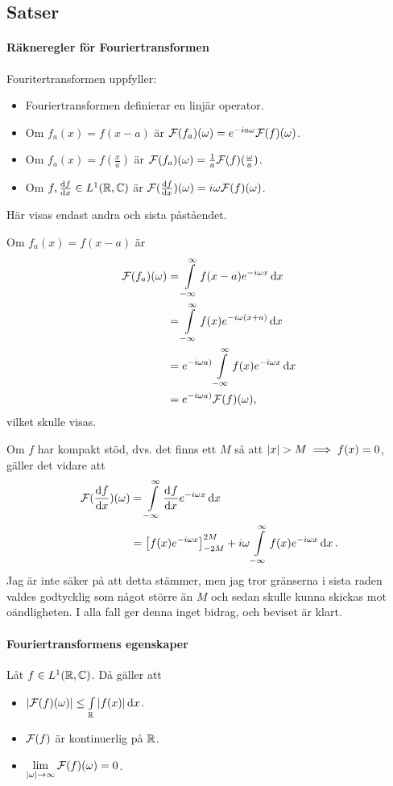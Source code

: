 \subsection{Satser}

\paragraph{Räkneregler för Fouriertransformen}
Fouritertransformen uppfyller:
\begin{itemize}
	\item Fouriertransformen definierar en linjär operator.
	\item Om $f_{a}(x) = f(x - a)$ är $\mathcal{F}(f_{a})(\omega) = e^{-ia\omega}\mathcal{F}(f)(\omega)$.
	\item Om $f_{a}(x) = f(\frac{x}{a})$ är $\mathcal{F}(f_{a})(\omega) = \frac{1}{a}\mathcal{F}(f)(\frac{\omega}{a})$.
	\item Om $f,\dv{f}{x}\in L^{1}(\mathbb{R}, \mathbb{C})$ är $\mathcal{F}(\dv{f}{x})(\omega) = i\omega\mathcal{F}(f)(\omega)$.
\end{itemize}

\proof
Här visas endast andra och sista påståendet.

Om $f_{a}(x) = f(x - a)$ är 
\begin{align*}
	\mathcal{F}(f_{a})(\omega) &= \int\limits_{-\infty}^{\infty}f(x - a)e^{-i\omega x}\dd{x} \\
	                    &= \int\limits_{-\infty}^{\infty}f(x)e^{-i\omega(x + a)}\dd{x} \\
	                    &= e^{-i\omega a)}\int\limits_{-\infty}^{\infty}f(x)e^{-i\omega x}\dd{x} \\
	                    &= e^{-i\omega a)}\mathcal{F}(f)(\omega),
\end{align*}
vilket skulle visas.

Om $f$ har kompakt stöd, dvs. det finns ett $M$ så att $\abs{x} > M\implies f(x) = 0$,  gäller det vidare att
\begin{align*}
	\mathcal{F}(\dv{f}{x})(\omega) &= \int\limits_{-\infty}^{\infty}\dv[]{f}{x} (x)e^{-i\omega x}\dd{x} \\
	                        &= \left[f(x)e^{-i\omega x}\right]_{-2M}^{2M} + i\omega\int\limits_{-\infty}^{\infty}f(x)e^{-i\omega x}\dd{x}.
\end{align*}
Jag är inte säker på att detta stämmer, men jag tror gränserna i sista raden valdes godtycklig som något större än $M$ och sedan skulle kunna skickas mot oändligheten. I alla fall ger denna inget bidrag, och beviset är klart.

\paragraph{Fouriertransformens egenskaper}
Låt $f\in L^{1}(\mathbb{R}, \mathbb{C})$. Då gäller att
\begin{itemize}
	\item $\abs{\mathcal{F}(f)(\omega)} \leq \int\limits_{\mathbb{R}}^{}\abs{f(x)}\dd{x}$.
	\item $\mathcal{F}(f)$ är kontinuerlig på $\mathbb{R}$.
	\item $\lim\limits_{\abs{\omega}\to\infty}\mathcal{F}(f)(\omega) = 0$.
\end{itemize}

